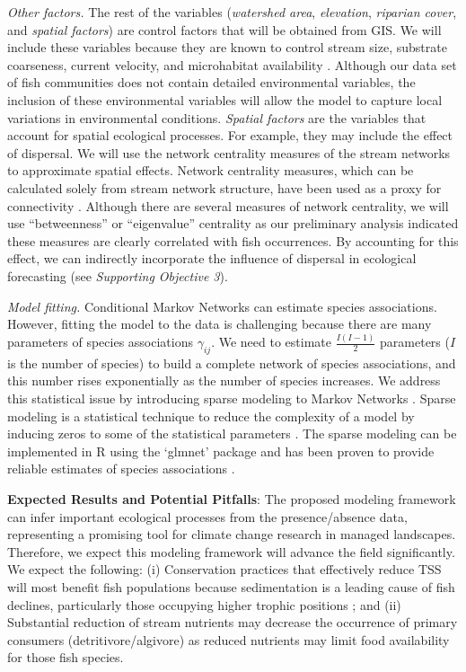 \documentclass[12pt, class=article, crop=false]{standalone}
\begin{document}
\textit{Other factors.} The rest of the variables (\textit{watershed area}, \textit{elevation}, \textit{riparian cover}, and \textit{spatial factors}) are control factors that will be obtained from GIS.
We will include these variables because they are known to control stream size, substrate coarseness, current velocity, and microhabitat availability \citep{altermatt_diversity_2013, finlay_stream_2011, terui_three_2016}.
Although our data set of fish communities does not contain detailed environmental variables, the inclusion of these environmental variables will allow the model to capture local variations in environmental conditions.
\textit{Spatial factors} are the variables that account for spatial ecological processes. For example, they may include the effect of dispersal.
We will use the network centrality measures of the stream networks to approximate spatial effects.
Network centrality measures, which can be calculated solely from stream network structure, have been used as a proxy for connectivity \citep{altermatt_river_2013, watson_identifying_2011}.
Although there are several measures of network centrality, we will use ``betweenness'' or ``eigenvalue'' centrality as our preliminary analysis indicated these measures are clearly correlated with fish occurrences. By accounting for this effect, we can indirectly incorporate the influence of dispersal in ecological forecasting (see \textit{Supporting Objective 3}).

\textit{Model fitting.} Conditional Markov Networks can estimate species associations.
However, fitting the model to the data is challenging because there are many parameters of species associations $\gamma_{ij}$. We need to estimate $\frac{I(I-1)}{2}$ parameters ($I$ is the number of species) to build a complete network of species associations, and this number rises exponentially as the number of species increases.
We address this statistical issue by introducing sparse modeling to Markov Networks \citep{cheng_sparse_2014}.
Sparse modeling is a statistical technique to reduce the complexity of a model by inducing zeros to some of the statistical parameters \citep{cheng_sparse_2014, lunn_bugs_2012, mutshinda_what_2009}.
The sparse modeling can be implemented in R using the `glmnet' package and has been proven to provide reliable estimates of species associations \citep{clark_unravelling_2018}. 

\textbf{Expected Results and Potential Pitfalls}: The proposed modeling framework can infer important ecological processes from the presence/absence data, representing a promising tool for climate change research in managed landscapes.
Therefore, we expect this modeling framework will advance the field significantly.
We expect the following:
(i) Conservation practices that effectively reduce TSS will most benefit fish populations because sedimentation is a leading cause of fish declines, particularly those occupying higher trophic positions \citep{kemp_impacts_2011}; and 
(ii) Substantial reduction of stream nutrients may decrease the occurrence of primary consumers (detritivore/algivore) as reduced nutrients may limit food availability for those fish species. 
\end{document}
